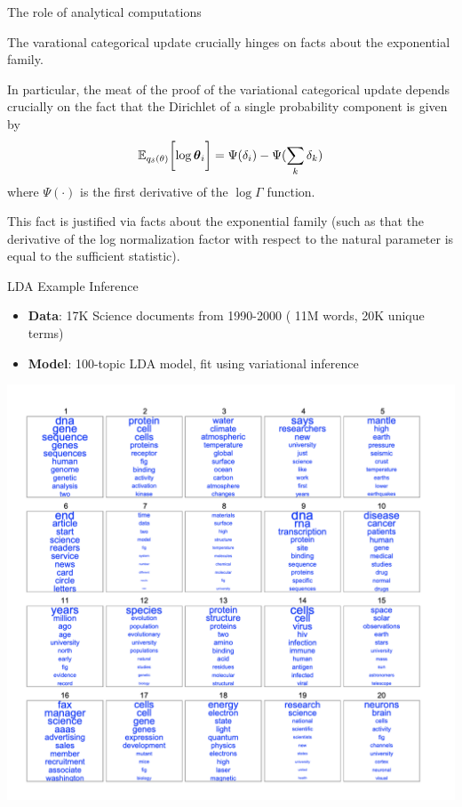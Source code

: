 \documentclass[10pt]{beamer}
\begin{document}
\begin{frame}{The role of analytical computations}

The varational categorical update crucially hinges on facts about the exponential family.  

In particular, the meat of the proof of the variational categorical update depends crucially on the fact that the Dirichlet of a single probability component is given by
\begin{equation} \label{dirichlet_expect_prob_component}
 \mathbb{E}_{{q_\delta(\theta)}} \bigg[ {{\log {\boldsymbol \theta}_i}} \bigg] =    \Psi(\delta_{i}) - \Psi (\displaystyle\sum_k \delta_k) 
\end{equation}
where $\Psi(\cdot)$ is the first derivative of the $\log \Gamma$ function. 

This fact is justified via facts about the exponential family (such as that the derivative of the log normalization factor with respect to the natural parameter is equal to the sufficient statistic). 

\end{frame}

\begin{frame}{LDA Example Inference}

\scriptsize
\begin{itemize}
\item \textbf{Data}: 17K Science documents from 1990-2000 ( 11M words, 20K unique terms)
\item \textbf{Model}: 100-topic LDA model, fit using variational inference
\end{itemize}

\begin{center}
\includegraphics[width=.75\textwidth]{images/lda_example_inference}
\end{center}


\end{frame}
\end{document}
